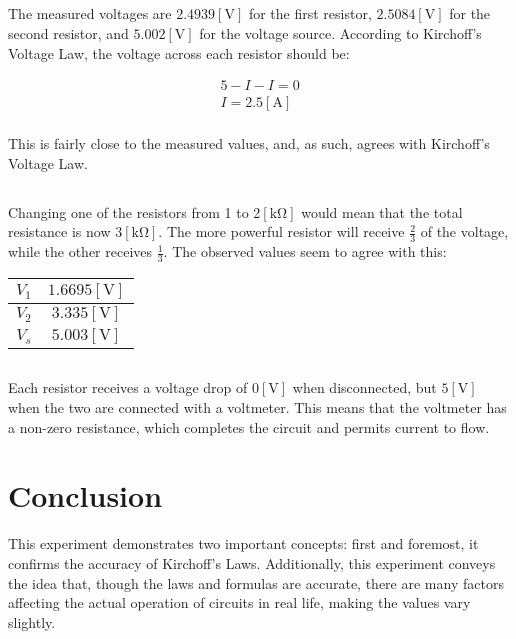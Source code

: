 \documentclass[
	letterpaper, %
	10pt, %
]{CSUniSchoolLabReport}
\begin{document}
\subsection{}

The measured voltages are $2.4939[\si{\volt}]$ for the first resistor, $2.5084[\si{\volt}]$ for the second resistor, and $5.002[\si{\volt}]$ for the voltage source. According to Kirchoff's Voltage Law, the voltage across each resistor should be:

\begin{equation}
  \begin{split}
    5-I-I=0\\
    I=2.5[\si{\ampere}]\\
  \end{split}
  \label{eq:3}
\end{equation}

This is fairly close to the measured values, and, as such, agrees with Kirchoff's Voltage Law.

\subsection{}

Changing one of the resistors from 1 to 2$[\si{\kilo\ohm}]$ would mean that the total resistance is now $3[\si{\kilo\ohm}]$. The more powerful resistor will receive $\frac{2}{3}$ of the voltage, while the other receives $\frac{1}{3}$. The observed values seem to agree with this:

\begin{center}
  \begin{tabular}[h]{|c|c|}
    \hline
    $V_1$ & $1.6695[\si{\volt}]$\\
    \hline
    $V_2$ & $3.335[\si{\volt}]$\\
    \hline
    $V_s$ & $5.003[\si{\volt}]$
    \hline
  \end{tabular}
\end{center}

\subsection{} \textcolor{green}{\checkmark}

\subsection{} Each resistor receives a voltage drop of $0[\si{\volt}]$ when disconnected, but $5[\si{\volt}]$ when the two are connected with a voltmeter. This means that the voltmeter has a non-zero resistance, which completes the circuit and permits current to flow.

\section{Conclusion}

This experiment demonstrates two important concepts: first and foremost, it confirms the accuracy of Kirchoff's Laws. Additionally, this experiment conveys the idea that, though the laws and formulas are accurate, there are many factors affecting the actual operation of circuits in real life, making the values vary slightly.
\end{document}
